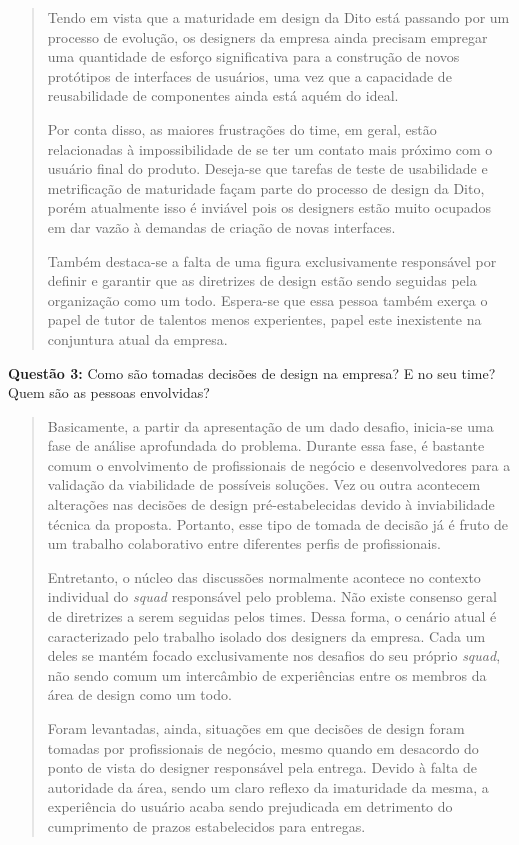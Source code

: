 \begin{quote}
    Tendo em vista que a maturidade em design da Dito está passando por um processo de evolução, os designers da empresa ainda precisam empregar uma quantidade de esforço significativa para a construção de novos protótipos de interfaces de usuários, uma vez que a capacidade de reusabilidade de componentes ainda está aquém do ideal. 
    
    Por conta disso, as maiores frustrações do time, em geral, estão relacionadas à impossibilidade de se ter um contato mais próximo com o usuário final do produto. Deseja-se que tarefas de teste de usabilidade e metrificação de maturidade façam parte do processo de design da Dito, porém atualmente isso é inviável pois os designers estão muito ocupados em dar vazão à demandas de criação de novas interfaces.
    
    Também destaca-se a falta de uma figura exclusivamente responsável por definir e garantir que as diretrizes de design estão sendo seguidas pela organização como um todo. Espera-se que essa pessoa também exerça o papel de tutor de talentos menos experientes, papel este inexistente na conjuntura atual da empresa.
\end{quote}

\textbf{Questão 3:} Como são tomadas decisões de design na empresa? E no seu time? Quem são as pessoas envolvidas?

\begin{quote}
    Basicamente, a partir da apresentação de um dado desafio, inicia-se uma fase de análise aprofundada do problema. Durante essa fase, é bastante comum o envolvimento de profissionais de negócio e desenvolvedores para a validação da viabilidade de possíveis soluções. Vez ou outra acontecem alterações nas decisões de design pré-estabelecidas devido à inviabilidade técnica da proposta. Portanto, esse tipo de tomada de decisão já é fruto de um trabalho colaborativo entre diferentes perfis de profissionais.
    
    Entretanto, o núcleo das discussões normalmente acontece no contexto individual do \textit{squad} responsável pelo problema. Não existe consenso geral de diretrizes a serem seguidas pelos times. Dessa forma, o cenário atual é caracterizado pelo trabalho isolado dos designers da empresa. Cada um deles se mantém focado exclusivamente nos desafios do seu próprio \textit{squad}, não sendo comum um intercâmbio de experiências entre os membros da área de design como um todo.
    
    Foram levantadas, ainda, situações em que decisões de design foram tomadas por profissionais de negócio, mesmo quando em desacordo do ponto de vista do designer responsável pela entrega. Devido à falta de autoridade da área, sendo um claro reflexo da imaturidade da mesma, a experiência do usuário acaba sendo prejudicada em detrimento do cumprimento de prazos estabelecidos para entregas.
\end{quote}

